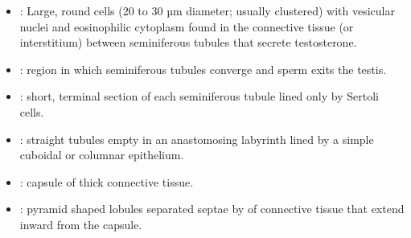 \begin{multicols}{2}
\begin{itemize}
  \begin{center}
  \end{center}
  
  \item {}:  Large, round cells (20 to 30 µm diameter; usually clustered) with vesicular nuclei and eosinophilic cytoplasm found in the connective tissue (or interstitium) between seminiferous tubules that secrete testosterone.
  
  \begin{center}
  \end{center}
  
  \item {}: region in which seminiferous tubules converge and sperm exits the testis. 
  
  \begin{center}
  \end{center}
  
  \item {}: short, terminal section of each seminiferous tubule lined only by Sertoli cells.
  
  \begin{center}
  \end{center}
  
  \item {}: straight tubules empty in an anastomosing labyrinth lined by a simple cuboidal or columnar epithelium.
  
  \begin{center}
  \end{center}
  
  \item {}:  capsule of thick connective tissue.
  
  \begin{center}
  \end{center}
  
  \item {}:  pyramid shaped lobules separated septae by of connective tissue that extend inward from the capsule.
  
  \begin{center}
  \end{center}
  

\end{itemize}
\end{multicols}
